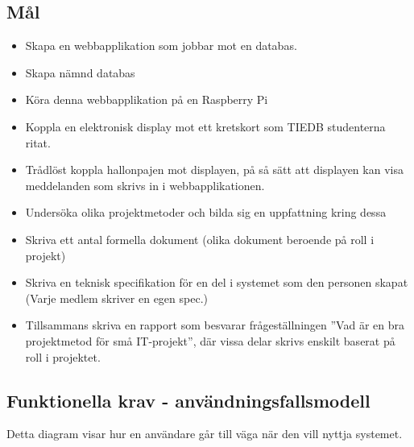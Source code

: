 \documentclass[11pt]{article}
\begin{document}
\subsection{Mål}
\label{sec:orgd9b463c}
\begin{itemize}
\item Skapa en webbapplikation som jobbar mot en databas.

\item Skapa nämnd databas

\item Köra denna webbapplikation på en Raspberry Pi

\item Koppla en elektronisk display mot ett kretskort som TIEDB studenterna
ritat.

\item Trådlöst koppla hallonpajen mot displayen, på så sätt att displayen
kan visa meddelanden som skrivs in i webbapplikationen.

\item Undersöka olika projektmetoder och bilda sig en uppfattning kring
dessa

\item Skriva ett antal formella dokument (olika dokument beroende på roll i
projekt)

\item Skriva en teknisk specifikation för en del i systemet som den
personen skapat (Varje medlem skriver en egen spec.)

\item Tillsammans skriva en rapport som besvarar frågeställningen ”Vad är
en bra projektmetod för små IT-projekt”, där vissa delar skrivs
enskilt baserat på roll i projektet.
\end{itemize}

\subsection{Funktionella krav - användningsfallsmodell}
\label{sec:org32f238d}
Detta diagram visar hur en användare går till väga när den vill nyttja
systemet.
\end{document}
